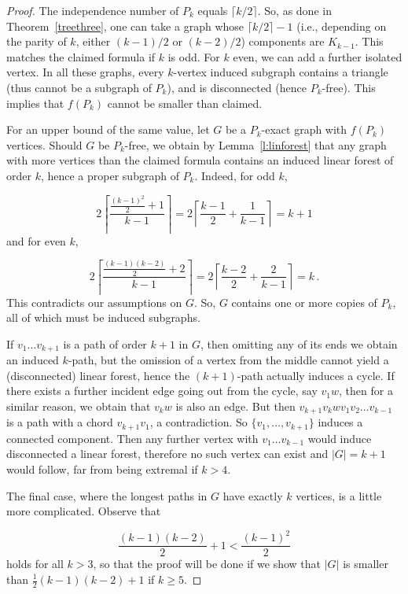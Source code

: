 \documentclass[a4paper,12pt]{article}
\begin{document}
\begin{proof}
	The independence number of $P_k$ equals $\lceil k/2 \rceil$.
	So, as done in Theorem~\ref{treethree}, one can take a graph whose $\lceil k/2 \rceil-1$ (i.e., depending on the parity of $k$, either $(k-1)/2$ or $(k-2)/2$) components are $K_{k-1}$.
	This matches the claimed formula if $k$ is odd.
	For $k$ even, we can add a further isolated vertex.
	In all these graphs, every $k$-vertex induced subgraph contains a triangle (thus cannot be a subgraph of $P_k$), and is disconnected (hence $P_k$-free).
	This implies that $f(P_k)$ cannot be smaller than claimed.
	
	For an upper bound of the same value, let $G$ be a $P_k$-exact graph with $f(P_k)$ vertices.
	Should $G$ be $P_k$-free, we obtain by Lemma~\ref{l:linforest} that any graph with more vertices than the claimed formula contains an induced linear forest of order $k$, hence a proper subgraph of $P_k$.
	Indeed, for odd $k$,
	
	$$
	  2\left\lceil \frac{\frac{(k-1)^2}{2}+1}{k-1} \right\rceil = 2 \left\lceil \frac{k-1}{2} + \frac{1}{k-1} \right\rceil = k+1
	$$
	and for even $k$,
	
	$$
	  2\left\lceil \frac{\frac{(k-1)(k-2)}{2}+2}{k-1} \right\rceil = 2 \left\lceil \frac{k-2}{2} + \frac{2}{k-1} \right\rceil = k \,.
	$$	
	This contradicts our assumptions on $G$.
	So, $G$ contains one or more copies of $P_k$, all of which must be induced subgraphs.
	
	If $v_1\dots v_{k+1}$ is a path of order $k+1$ in $G$, then omitting any of its ends we obtain an induced $k$-path, but the omission of a vertex from the middle cannot yield a (disconnected) linear forest, hence the $(k+1)$-path actually induces a cycle.
	If there exists a further incident edge going out from the cycle, say $v_1w$, then for a similar reason, we obtain that $v_kw$ is also an edge.
	But then $v_{k+1}v_kwv_1v_2\dots v_{k-1}$ is a path with a chord $v_{k+1}v_1$, a contradiction.
	So $\{v_1,\dots,v_{k+1}\}$ induces a connected component.
	Then any further vertex with $v_1\dots v_{k-1}$ would induce disconnected a linear forest, therefore no such vertex can exist and $|G|=k+1$ would follow, far from being extremal if $k>4$.
	
	The final case, where the longest paths in $G$ have exactly $k$ vertices, is a little more complicated.
	Observe that
	
	$$
	  \frac{(k-1)(k-2)}{2}+1 < \frac{(k-1)^2}{2}
	$$
	holds for all $k>3$, so that the proof will be done if we show that $|G|$ is smaller than $\frac{1}{2}(k-1)(k-2)+1$ if $k\geq 5$.
	

\end{proof}
\end{document}
